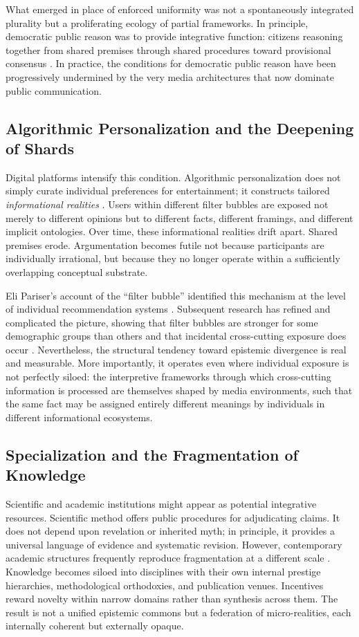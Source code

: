 \documentclass[11pt]{article}
\begin{document}
What emerged in place of enforced uniformity was not a spontaneously integrated plurality but a proliferating ecology of partial frameworks. In principle, democratic public reason was to provide integrative function: citizens reasoning together from shared premises through shared procedures toward provisional consensus \citep{Rawls1993}. In practice, the conditions for democratic public reason have been progressively undermined by the very media architectures that now dominate public communication.

\subsection{Algorithmic Personalization and the Deepening of Shards}

Digital platforms intensify this condition. Algorithmic personalization does not simply curate individual preferences for entertainment; it constructs tailored \emph{informational realities} \citep{Pariser2011}. Users within different filter bubbles are exposed not merely to different opinions but to different facts, different framings, and different implicit ontologies. Over time, these informational realities drift apart. Shared premises erode. Argumentation becomes futile not because participants are individually irrational, but because they no longer operate within a sufficiently overlapping conceptual substrate.

Eli Pariser's account of the ``filter bubble'' identified this mechanism at the level of individual recommendation systems \citep{Pariser2011}. Subsequent research has refined and complicated the picture, showing that filter bubbles are stronger for some demographic groups than others and that incidental cross-cutting exposure does occur \citep{Guess2018}. Nevertheless, the structural tendency toward epistemic divergence is real and measurable. More importantly, it operates even where individual exposure is not perfectly siloed: the interpretive frameworks through which cross-cutting information is processed are themselves shaped by media environments, such that the same fact may be assigned entirely different meanings by individuals in different informational ecosystems.

\subsection{Specialization and the Fragmentation of Knowledge}

Scientific and academic institutions might appear as potential integrative resources. Scientific method offers public procedures for adjudicating claims. It does not depend upon revelation or inherited myth; in principle, it provides a universal language of evidence and systematic revision. However, contemporary academic structures frequently reproduce fragmentation at a different scale \citep{Gibbons1994}. Knowledge becomes siloed into disciplines with their own internal prestige hierarchies, methodological orthodoxies, and publication venues. Incentives reward novelty within narrow domains rather than synthesis across them. The result is not a unified epistemic commons but a federation of micro-realities, each internally coherent but externally opaque.
\end{document}
